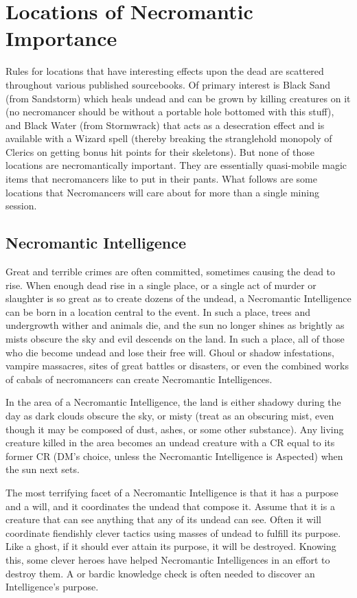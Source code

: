 \section{Locations of Necromantic Importance}

Rules for locations that have interesting effects upon the dead are scattered throughout various published sourcebooks. Of primary interest is Black Sand (from Sandstorm) which heals undead and can be grown by killing creatures on it (no necromancer should be without a portable hole bottomed with this stuff), and Black Water (from Stormwrack) that acts as a desecration effect and is available with a Wizard spell (thereby breaking the stranglehold monopoly of Clerics on getting bonus hit points for their skeletons). But none of those locations are necromantically important. They are essentially quasi-mobile magic items that necromancers like to put in their pants. What follows are some locations that Necromancers will care about for more than a single mining session.

\subsection{Necromantic Intelligence}

Great and terrible crimes are often committed, sometimes causing the dead to rise. When enough dead rise in a single place, or a single act of murder or slaughter is so great as to create dozens of the undead, a Necromantic Intelligence can be born in a location central to the event. In such a place, trees and undergrowth wither and animals die, and the sun no longer shines as brightly as mists obscure the sky and evil descends on the land. In such a place, all of those who die become undead and lose their free will. Ghoul or shadow infestations, vampire massacres, sites of great battles or disasters, or even the combined works of cabals of necromancers can create Necromantic Intelligences.

In the area of a Necromantic Intelligence, the land is either shadowy during the day as dark clouds obscure the sky, or misty (treat as an obscuring mist, even though it may be composed of dust, ashes, or some other substance). Any living creature killed in the area becomes an undead creature with a CR equal to its former CR (DM's choice, unless the Necromantic Intelligence is Aspected) when the sun next sets.

The most terrifying facet of a Necromantic Intelligence is that it has a purpose and a will, and it coordinates the undead that compose it. Assume that it is a creature that can see anything that any of its undead can see. Often it will coordinate fiendishly clever tactics using masses of undead to fulfill its purpose. Like a ghost, if it should ever attain its purpose, it will be destroyed. Knowing this, some clever heroes have helped Necromantic Intelligences in an effort to destroy them. A  or bardic knowledge check is often needed to discover an Intelligence's purpose.

